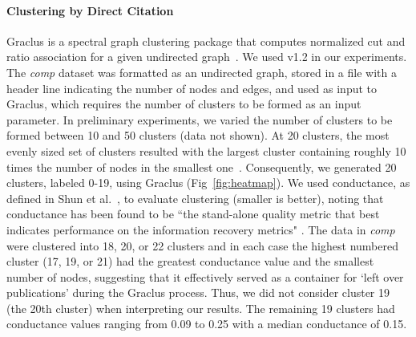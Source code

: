 \paragraph{Clustering by Direct Citation} Graclus is a spectral graph clustering package that computes normalized cut and ratio association for a given undirected graph~\cite{graclus_2007}.  We used v1.2 in our experiments. The \emph{comp} dataset was formatted as an undirected graph, stored in a file with a header line indicating the number of nodes and edges, and used as input to Graclus, which requires the number of clusters to be formed as an input parameter. In preliminary experiments, we varied the number of clusters to be formed between 10 and 50 clusters (data not shown).  At 20 clusters, the most evenly sized set of clusters resulted with the largest cluster containing roughly 10 times the number of nodes in the smallest one~\cite{traag_louvain_2019}.  Consequently, we generated 20 clusters, labeled 0-19, using Graclus (Fig~\ref{fig:heatmap}).
We used conductance, as defined in Shun et al.~\cite{shun_parallel_2016}, to  evaluate clustering (smaller is better), noting that
conductance has been found to be ``the stand-alone quality metric that best indicates performance on the information recovery metrics" \cite{emmons2016analysis}.
The data in \emph{comp} were clustered into 18, 20, or 22 clusters and in each case the highest numbered cluster (17, 19, or 21) had the greatest conductance value and the smallest number of nodes, suggesting that it effectively served as a container for `left over publications' during the Graclus process. Thus, we did not consider cluster 19 (the 20th cluster) when interpreting our results.  The remaining 19 clusters had conductance values ranging from 0.09 to 0.25 with a median conductance of 0.15.

